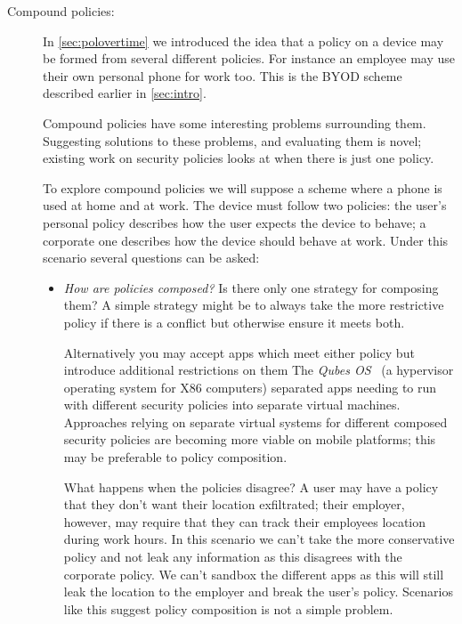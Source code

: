 \documentclass[a4paper,sfsidenotes]{%
  article%
}
\begin{document}
\begin{description}
  \item[Compound policies:] In \autoref{sec:polovertime} we introduced the idea that a policy on a
    device may be formed from several different policies.  For instance an
    employee may use their own personal phone for work too.  This is the
    \ac{BYOD} scheme described earlier in \autoref{sec:intro}.
    
    Compound policies have some interesting problems surrounding them.
    Suggesting solutions to these problems, and evaluating them is novel;
    existing work on security policies looks at when there is just one policy.

    To explore compound policies we will suppose a scheme where a phone is used
    at home and at work.  The device must follow two policies: the user's
    personal policy describes how the user expects the device to behave; a
    corporate one describes how the device should behave at work.  Under this
    scenario several questions can be asked:

    \begin{itemize}
    
      \item \emph{How are policies composed?}  Is there only one strategy for
        composing them?  A simple strategy might be to always take the more
        restrictive policy if there is a conflict but otherwise ensure it meets
        both.  
        
        Alternatively you may accept apps which meet either policy but
        introduce additional restrictions on them
        The \emph{Qubes OS}~\cite{Rutkowska:2010wr} (a hypervisor
        operating system for X86 computers) separated apps needing to run with
        different security policies into separate virtual machines.  Approaches
        relying on separate virtual systems for different composed security
        policies are becoming more viable on mobile platforms; this may be
        preferable to policy composition.

        What happens when the policies disagree?  A user may have a policy that
        they don't want their location exfiltrated; their employer, however, may
        require that they can track their employees location during work hours.  
        In this scenario we can't take the more conservative policy and not leak
        any information as this disagrees with the corporate policy.  We can't
        sandbox the different apps as this will still leak the location to the
        employer and break the user's policy.  Scenarios like this suggest
        policy composition is not a simple problem.


\end{itemize}
\end{description}
\end{document}
